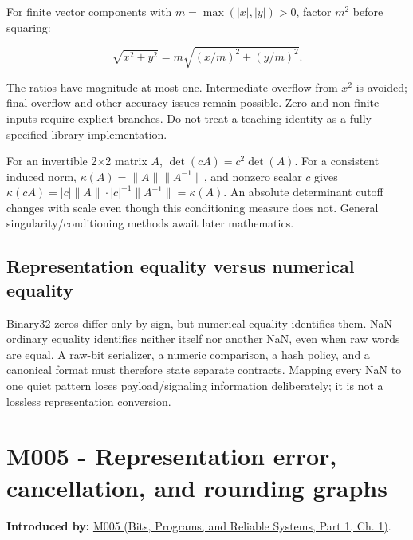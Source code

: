 \hypertarget{03-visual-computing-i-ch018-scaling-a-norm-and-a-determinant}{}

For finite vector components with \(m=\max(|x|,|y|)>0\), factor \(m^2\) before squaring:

\[
\sqrt{x^2+y^2}=m\sqrt{(x/m)^2+(y/m)^2}.
\]

The ratios have magnitude at most one. Intermediate overflow from \(x^2\) is avoided; final overflow and other accuracy issues remain possible. Zero and non-finite inputs require explicit branches. Do not treat a teaching identity as a fully specified library implementation.

For an invertible 2×2 matrix \(A\), \(\det(cA)=c^2\det(A)\). For a consistent induced norm, \(\kappa(A)=\|A\|\|A^{-1}\|\), and nonzero scalar \(c\) gives \(\kappa(cA)=|c|\|A\|\cdot|c|^{-1}\|A^{-1}\|=\kappa(A)\). An absolute determinant cutoff changes with scale even though this conditioning measure does not. General singularity/conditioning methods await later mathematics.

\subsection{Representation equality versus numerical equality}\label{03-visual-computing-i-ch018-representation-equality-versus-numerical-equality}

\hypertarget{03-visual-computing-i-ch018-representation-equality-versus-numerical-equality}{}

Binary32 zeros differ only by sign, but numerical equality identifies them. NaN ordinary equality identifies neither itself nor another NaN, even when raw words are equal. A raw-bit serializer, a numeric comparison, a hash policy, and a canonical format must therefore state separate contracts. Mapping every NaN to one quiet pattern loses payload/signaling information deliberately; it is not a lossless representation conversion.

\section{M005 - Representation error, cancellation, and rounding graphs}\label{03-visual-computing-i-ch018-m005---representation-error-cancellation-and-rounding-graphs}

\hypertarget{03-visual-computing-i-ch018-m005---representation-error-cancellation-and-rounding-graphs}{}

\textbf{Introduced by:} \href{../01-Bits-Programs-and-Reliable-Systems-P01/main.pdf\#nameddest=01-foundations-i-ch001-when-arithmetic-meets-uncertainty}{M005 (Bits, Programs, and Reliable Systems, Part 1, Ch. 1)}.


